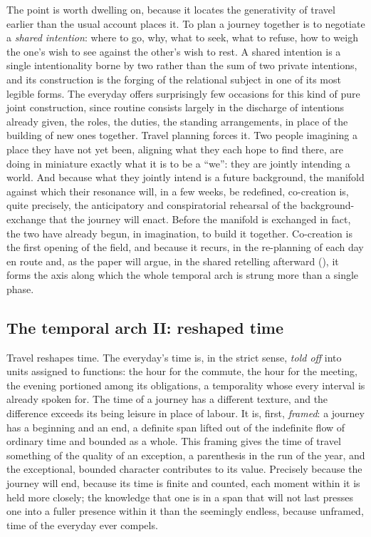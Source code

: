 The point is worth dwelling on, because it locates the generativity of travel earlier than the usual account places it. To plan a journey together is to negotiate a \emph{shared intention}: where to go, why, what to seek, what to refuse, how to weigh the one's wish to see against the other's wish to rest. A shared intention is a single intentionality borne by two rather than the sum of two private intentions, and its construction is the forging of the relational subject in one of its most legible forms. The everyday offers surprisingly few occasions for this kind of pure joint construction, since routine consists largely in the discharge of intentions already given, the roles, the duties, the standing arrangements, in place of the building of new ones together. Travel planning forces it. Two people imagining a place they have not yet been, aligning what they each hope to find there, are doing in miniature exactly what it is to be a ``we'': they are jointly intending a world. And because what they jointly intend is a future background, the manifold against which their resonance will, in a few weeks, be redefined, co-creation is, quite precisely, the anticipatory and conspiratorial rehearsal of the background-exchange that the journey will enact. Before the manifold is exchanged in fact, the two have already begun, in imagination, to build it together. Co-creation is the first opening of the field, and because it recurs, in the re-planning of each day en route and, as the paper will argue, in the shared retelling afterward (), it forms the axis along which the whole temporal arch is strung more than a single phase.

\subsection{The temporal arch II: reshaped time}
\label{p21:sub:field-time}

Travel reshapes time. The everyday's time is, in the strict sense, \emph{told off} into units assigned to functions: the hour for the commute, the hour for the meeting, the evening portioned among its obligations, a temporality whose every interval is already spoken for. The time of a journey has a different texture, and the difference exceeds its being leisure in place of labour. It is, first, \emph{framed}: a journey has a beginning and an end, a definite span lifted out of the indefinite flow of ordinary time and bounded as a whole. This framing gives the time of travel something of the quality of an exception, a parenthesis in the run of the year, and the exceptional, bounded character contributes to its value. Precisely because the journey will end, because its time is finite and counted, each moment within it is held more closely; the knowledge that one is in a span that will not last presses one into a fuller presence within it than the seemingly endless, because unframed, time of the everyday ever compels.

